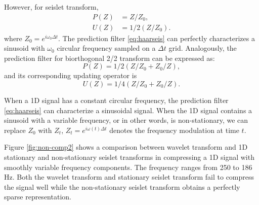 However, for seislet transform,
\begin{align}
\label{eq:haarseis}
P(Z)&=Z/Z_0, \\
\label{eq:haarseisu}
U(Z)&=1/2(Z/Z_0).
\end{align}
where $Z_0=e^{i\omega_0\Delta t}$. The prediction filter \ref{eq:haarseis} can perfectly characterizes a sinusoid with $\omega_0$ circular frequency sampled on a $\Delta t$ grid.
Analogously, the prediction filter for biorthogonal 2/2 transform can be expressed as:
\begin{equation}
\label{eq:linearseis0}
P(Z)=1/2(Z/Z_0+Z_0/Z),
\end{equation}
and its corresponding updating operator is
\begin{equation}
\label{eq:uplinearseis0}
U(Z)=1/4(Z/Z_0+Z_0/Z).
\end{equation}

When a 1D signal has a constant circular frequency, the prediction filter \ref{eq:haarseis} can characterize a sinusoidal signal. When the 1D signal contains a sinusoid with a variable frequency, or in other words, is non-stationary, we can replace $Z_0$ with $Z_t$,  $Z_t=e^{i\omega(t)\Delta t}$ denotes the frequency modulation at time $t$.%

Figure \ref{fig:non-comp2} shows a comparison between wavelet transform and 1D stationary and non-stationary seislet transforms in compressing a 1D signal with smoothly variable frequency components. The frequency ranges from 250 to 186 Hz. Both the wavelet transform and stationary seislet transform fail to compress the signal well while the non-stationary seislet transform obtains a perfectly sparse representation.

